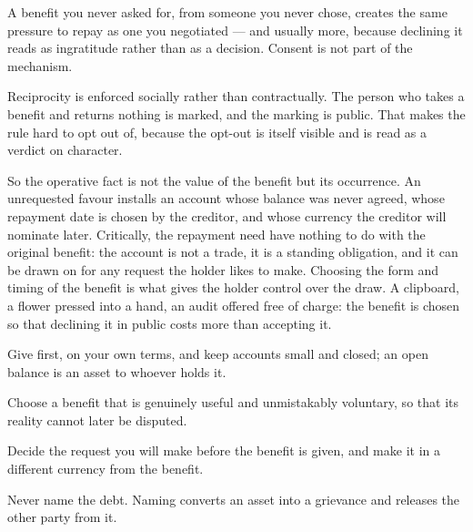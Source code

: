 


\begin{core}
A benefit you never asked for, from someone you never chose, creates the same pressure to repay as one you negotiated --- and usually more, because declining it reads as ingratitude rather than as a decision. Consent is not part of the mechanism.
\end{core}

\begin{mechanism}
Reciprocity is enforced socially rather than contractually. The person who takes a benefit and returns nothing is marked, and the marking is public. That makes the rule hard to opt out of, because the opt-out is itself visible and is read as a verdict on character.

So the operative fact is not the value of the benefit but its occurrence. An unrequested favour installs an account whose balance was never agreed, whose repayment date is chosen by the creditor, and whose currency the creditor will nominate later. Critically, the repayment need have nothing to do with the original benefit: the account is not a trade, it is a standing obligation, and it can be drawn on for any request the holder likes to make. Choosing the form and timing of the benefit is what gives the holder control over the draw.
A clipboard, a flower pressed into a hand, an audit offered free of charge: the benefit is chosen so that declining it in public costs more than accepting it.
\end{mechanism}


\begin{application}
  \item Give first, on your own terms, and keep accounts small and closed; an open balance is an asset to whoever holds it.
  \item Choose a benefit that is genuinely useful and unmistakably voluntary, so that its reality cannot later be disputed.
  \item Decide the request you will make before the benefit is given, and make it in a different currency from the benefit.
  \item Never name the debt. Naming converts an asset into a grievance and releases the other party from it.
\end{application}

